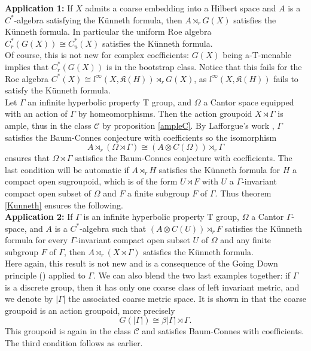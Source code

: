 \textbf{Application 1:} If $X$ admits a coarse embedding into a Hilbert space and $A$ is a $C^*$-algebra satisfying the Künneth formula, then $A\rtimes_r G(X)$ satisfies the Künneth formula. In particular the uniform Roe algebra $C_r^*(G(X))\cong C_u^* (X) $ satisfies the Künneth formula.  \\

Of course, this is not new for complex coefficients: $G(X)$ being a-T-menable implies that $C_r^*(G(X))$ is in the bootstrap class. Notice that this fails for the Roe algebra $C^*(X) \cong l^\infty (X, \mathfrak K(H)) \rtimes_r G(X)$, as $l^\infty (X, \mathfrak K(H))$ fails to satisfy the Künneth formula. \\ 

Let $\Gamma$ an infinite hyperbolic property T group, and $\Omega$ a Cantor space equipped with an action of $\Gamma$ by homeomorphisms. Then the action groupoid $X\rtimes \Gamma$ is ample, thus in the class $\mathcal C$ by proposition \ref{ampleC}. By Lafforgue's work \cite{lafforgue2012conjecture}, $\Gamma$ satisfies the Baum-Connes conjecture with coefficients so the isomorphism \[A\rtimes_r (\Omega\rtimes \Gamma) \cong (A\otimes C(\Omega))\rtimes_r \Gamma \]
ensures that $\Omega\rtimes \Gamma$ satisfies the Baum-Connes conjecture with coefficients. The last condition will be automatic if $A\rtimes_r H$ satisfies the Künneth formula for $H$ a compact open sugroupoid, which is of the form $U\rtimes F $ with $U $ a $\Gamma$-invariant compact open subset of $\Omega$ and $F$ a finite subgroup $F$ of $\Gamma$. Thus theorem \ref{Kunneth} ensures the following.\\

\textbf{Application 2: } If $\Gamma$ is an infinite hyperbolic property T group, $\Omega$ a Cantor $\Gamma$-space, and $A$ is a $C^*$-algebra such that $(A\otimes C(U))\rtimes_r F$ satisfies the Künneth formula for every $\Gamma$-invariant compact open subset $U$ of $\Omega$ and any finite subgroup $F$ of $\Gamma$, then $A \rtimes_r (X\rtimes \Gamma)$ satisfies the Künneth formula. \\ 

Here again, this result is not new and is a consequence of the Going Down principle (\cite{ChabertEOY}) applied to $\Gamma$. We can also blend the two last examples together: if $\Gamma$ is a discrete group, then it has only one coarse class of left invariant metric, and we denote by $|\Gamma|$ the associated coarse metric space. It is shown in \cite{SkTuYu} that the coarse groupoid is an action groupoid, more precisely \[G(|\Gamma|) \cong \beta |\Gamma| \rtimes \Gamma.\]
This groupoid is again in the class $\mathcal C$ and satisfies Baum-Connes with coefficients. The third condition follows as earlier.\\

